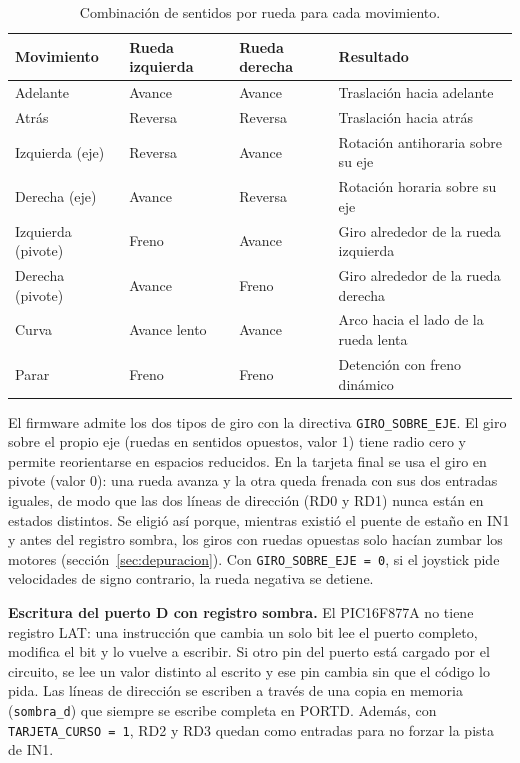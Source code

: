 \begin{table}[H]
  \centering
  \caption{Combinación de sentidos por rueda para cada movimiento.}
  \label{tab:cinematica}
  \begin{tabular}{@{}l l l l@{}}
    \toprule
    \textbf{Movimiento} & \textbf{Rueda izquierda} & \textbf{Rueda derecha} & \textbf{Resultado} \\
    \midrule
    Adelante  & Avance  & Avance  & Traslación hacia adelante \\
    Atrás     & Reversa & Reversa & Traslación hacia atrás \\
    Izquierda (eje)    & Reversa & Avance  & Rotación antihoraria sobre su eje \\
    Derecha (eje)      & Avance  & Reversa & Rotación horaria sobre su eje \\
    Izquierda (pivote) & Freno   & Avance  & Giro alrededor de la rueda izquierda \\
    Derecha (pivote)   & Avance  & Freno   & Giro alrededor de la rueda derecha \\
    Curva     & Avance lento & Avance & Arco hacia el lado de la rueda lenta \\
    Parar     & Freno   & Freno   & Detención con freno dinámico \\
    \bottomrule
  \end{tabular}
\end{table}

El firmware admite los dos tipos de giro con la directiva
\texttt{GIRO\_SOBRE\_EJE}. El giro sobre el propio eje (ruedas en sentidos
opuestos, valor 1) tiene radio cero y permite reorientarse en espacios
reducidos. En la tarjeta final se usa el giro en pivote (valor 0): una rueda
avanza y la otra queda frenada con sus dos entradas iguales, de modo que las
dos líneas de dirección (RD0 y RD1) nunca están en estados distintos. Se eligió
así porque, mientras existió el puente de estaño en IN1 y antes del registro
sombra, los giros con ruedas opuestas solo hacían zumbar los motores
(sección~\ref{sec:depuracion}). Con \texttt{GIRO\_SOBRE\_EJE = 0}, si el
joystick pide velocidades de signo contrario, la rueda negativa se detiene.

\noindent\textbf{Escritura del puerto D con registro sombra.} El PIC16F877A no
tiene registro LAT: una instrucción que cambia un solo bit lee el puerto
completo, modifica el bit y lo vuelve a escribir. Si otro pin del puerto está
cargado por el circuito, se lee un valor distinto al escrito y ese pin cambia
sin que el código lo pida. Las líneas de dirección se escriben a través de una
copia en memoria (\texttt{sombra\_d}) que siempre se escribe completa en
PORTD. Además, con \texttt{TARJETA\_CURSO = 1}, RD2 y RD3 quedan como entradas
para no forzar la pista de IN1.

